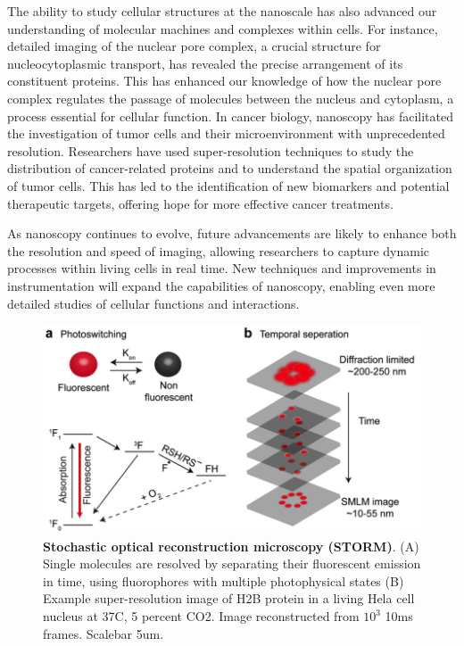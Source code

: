 The ability to study cellular structures at the nanoscale has also advanced our understanding of molecular machines and complexes within cells. For instance, detailed imaging of the nuclear pore complex, a crucial structure for nucleocytoplasmic transport, has revealed the precise arrangement of its constituent proteins. This has enhanced our knowledge of how the nuclear pore complex regulates the passage of molecules between the nucleus and cytoplasm, a process essential for cellular function. In cancer biology, nanoscopy has facilitated the investigation of tumor cells and their microenvironment with unprecedented resolution. Researchers have used super-resolution techniques to study the distribution of cancer-related proteins and to understand the spatial organization of tumor cells. This has led to the identification of new biomarkers and potential therapeutic targets, offering hope for more effective cancer treatments.

As nanoscopy continues to evolve, future advancements are likely to enhance both the resolution and speed of imaging, allowing researchers to capture dynamic processes within living cells in real time. New techniques and improvements in instrumentation will expand the capabilities of nanoscopy, enabling even more detailed studies of cellular functions and interactions.

\begin{figure}[t]
\centering
\includegraphics[width=12cm]{media/Intro.png}
\caption{\textbf{Stochastic optical reconstruction microscopy (STORM)}. (A) Single molecules are resolved by separating their fluorescent emission in time, using fluorophores with multiple photophysical states (B) Example super-resolution image of H2B protein in a living Hela cell nucleus at 37C, 5 percent CO2. Image reconstructed from $10^{3}$ 10ms frames. Scalebar 5um.}
\end{figure}

